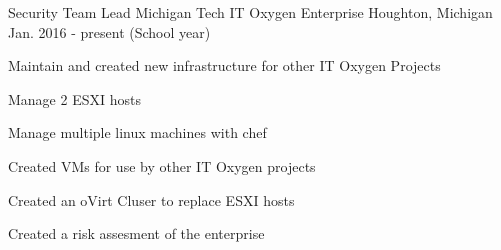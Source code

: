 \begin{cventries}
 \cventry
    {Security Team Lead} %
    {Michigan Tech IT Oxygen Enterprise} %
    {Houghton, Michigan} %
    {Jan. 2016 - present (School year)} %
    {
      \begin{cvitems} %
        \item {Maintain and created new infrastructure for other IT Oxygen Projects}
        \item {Manage 2 ESXI hosts}
        \item {Manage multiple linux machines with chef}
        \item {Created VMs for use by other IT Oxygen projects}
	\item {Created an oVirt Cluser to replace ESXI hosts}
	\item {Created a risk assesment of the enterprise}
      \end{cvitems}
    }
\end{cventries}
